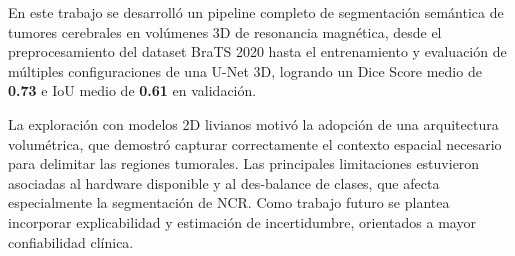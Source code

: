 En este trabajo se desarrolló un pipeline completo de segmentación semántica de tumores cerebrales en volúmenes 3D de resonancia magnética, desde el preprocesamiento del dataset BraTS 2020 hasta el entrenamiento y evaluación de múltiples configuraciones de una U-Net 3D, logrando un Dice Score medio de \textbf{0.73} e IoU medio de \textbf{0.61} en validación.

La exploración con modelos 2D livianos motivó la adopción de una arquitectura volumétrica, que demostró capturar correctamente el contexto espacial necesario para delimitar las regiones tumorales. Las principales limitaciones estuvieron asociadas al hardware disponible y al des-balance de clases, que afecta especialmente la segmentación de NCR. Como trabajo futuro se plantea incorporar explicabilidad y estimación de incertidumbre, orientados a mayor confiabilidad clínica.

\newpage
\clearpage

